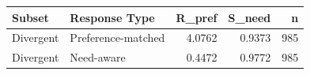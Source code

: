 \begin{tabular}{llrrr}
\toprule
Subset & Response Type & R_pref & S_need & n \\
\midrule
Divergent & Preference-matched & 4.0762 & 0.9373 & 985 \\
Divergent & Need-aware & 0.4472 & 0.9772 & 985 \\
\bottomrule
\end{tabular}
